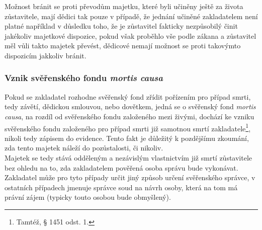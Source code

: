 \documentclass{article}
\begin{document}
Možnost bránit se proti převodům majetku, které byli učiněny ještě za života zůstavitele, mají dědici tak pouze v případě, že jednání učiněné zakladatelem není platné například v důsledku toho, že je zůstavitel fakticky nezpůsobilý činit jakékoliv majetkové dispozice, pokud však proběhlo vše podle zákana a zůstavitel měl vůli takto majetek převést, dědicové nemají možnost se proti takovýmto dispozicím jakkoliv bránit.\\




\subsubsection{Vznik svěřenského fondu \textit{mortis causa}}

Pokud se zakladatel rozhodne svěřenský fond zřídit pořízením pro případ smrti, tedy závětí, dědickou smlouvou, nebo dovětkem, jedná se o svěřenský fond \textit{mortis causa}, na rozdíl od svěřenského fondu založeného mezi živými, dochází ke vzniku svěřenského fondu založeného pro případ smrti již samotnou smrtí zakladatele\footnote{Tamtéž, § 1451 odst. 1.}, nikoli tedy zápisem do evidence. Tento fakt je důležitý k pozdějšímu zkoumání, zda tento majetek náleží do pozůstalosti, či nikoliv.\\

Majetek se tedy stává odděleným a nezávislým vlastnictvím již smrtí zůstavitele bez ohledu na to, zda zakladatelem pověřená osoba správu bude vykonávat. Zakladatel může pro tyto případy určit jiný způsob určení svěřenského správce, v ostatních případech jmenuje správce soud na návrh osoby, která na tom má právní zájem (typicky touto osobou bude obmyšlený).\\
\end{document}
